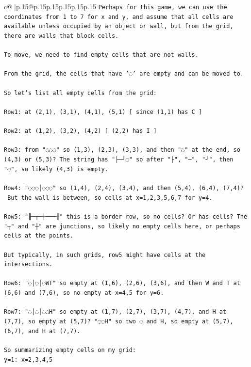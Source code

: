 \documentclass{article}
\begin{document}
{\begin{supertabular}{c@{$\;$}|p{.15\linewidth}@{}p{.15\linewidth}p{.15\linewidth}p{.15\linewidth}p{.15\linewidth}p{.15\linewidth}}
{{{\texttt{Perhaps for this game, we can use the coordinates from 1 to 7 for x and y, and assume that all cells are available unless occupied by an object or wall, but from the grid, there are walls that block cells.} \\
\\ 
\texttt{To move, we need to find empty cells that are not walls.} \\
\\ 
\texttt{From the grid, the cells that have '◌' are empty and can be moved to.} \\
\\ 
\texttt{So let's list all empty cells from the grid:} \\
\\ 
\texttt{Row1: at (2,1), (3,1), (4,1), (5,1)  {[} since (1,1) has C {]}} \\
\\ 
\texttt{Row2: at (1,2), (3,2), (4,2)  {[} (2,2) has I {]}} \\
\\ 
\texttt{Row3: from "◌◌◌" so (1,3), (2,3), (3,3), and then "◌" at the end, so (4,3) or (5,3)? The string has "├─┘◌" so after "├", "─", "┘", then "◌", so likely (4,3) is empty.} \\
\\ 
\texttt{Row4: "◌◌◌│◌◌◌" so (1,4), (2,4), (3,4), and then (5,4), (6,4), (7,4)?} \\
\texttt{ But the wall is between, so cells at x=1,2,3,5,6,7 for y=4.} \\
\\ 
\texttt{Row5: "╟─┬─┼───╢" this is a border row, so no cells? Or has cells? The "┬" and "┼" are junctions, so likely no empty cells here, or perhaps cells at the points.} \\
\\ 
\texttt{But typically, in such grids, row5 might have cells at the intersections.} \\
\\ 
\texttt{Row6: "◌│◌│◌WT" so empty at (1,6), (2,6), (3,6), and then W and T at (6,6) and (7,6), so no empty at x=4,5 for y=6.} \\
\\ 
\texttt{Row7: "◌│◌│◌◌H" so empty at (1,7), (2,7), (3,7), (4,7), and H at (7,7), so empty at (5,7)? "◌◌H" so two ◌ and H, so empty at (5,7), (6,7), and H at (7,7).} \\
\\ 
\texttt{So summarizing empty cells on my grid:} \\
\texttt{y=1: x=2,3,4,5} \\
}}}
\end{supertabular}}
\end{document}
